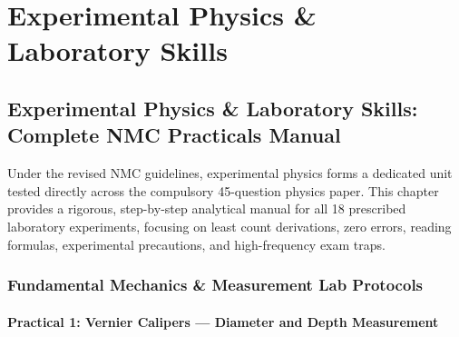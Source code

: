 \documentclass[10pt,twoside,openright]{book}
\begin{document}
\part{Experimental Physics \& Laboratory Skills}

\chapter{Experimental Physics \& Laboratory Skills: Complete NMC Practicals Manual}

Under the revised NMC guidelines, experimental physics forms a dedicated unit tested directly across the compulsory 45-question physics paper. This chapter provides a rigorous, step-by-step analytical manual for all 18 prescribed laboratory experiments, focusing on least count derivations, zero errors, reading formulas, experimental precautions, and high-frequency exam traps.

\section{Fundamental Mechanics \& Measurement Lab Protocols}

\subsection{Practical 1: Vernier Calipers --- Diameter and Depth Measurement}
\end{document}
